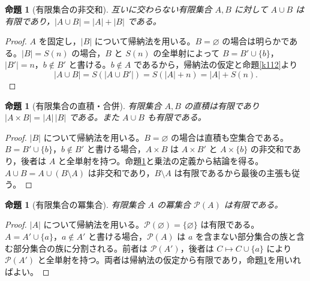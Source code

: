 \documentclass[a5paper,10pt,dvipdfmx]{jsarticle}
\theoremstyle{definition}
\theoremstyle{plain}
\newtheorem{prop}[ruledef]{命題}
\newcommand{\Pow}{\mathcal{P}}
\begin{document}
\begin{prop}[有限集合の非交和]\label{k115}
互いに交わらない有限集合 $A,B$ に対して $A\cup B$ は有限であり，$|A\cup B|=|A|+|B|$ である。
\end{prop}
\begin{proof}
$A$ を固定し，$|B|$ について帰納法を用いる。$B=\varnothing$ の場合は明らかである。$|B|=S(n)$ の場合，$B$ と $S(n)$ の全単射によって $B=B'\cup\{b\}$，$|B'|=n$，$b\notin B'$ と書ける。$b\notin A$ であるから，帰納法の仮定と命題\ref{k112}より
\[ |A\cup B|=S(|A\cup B'|)=S(|A|+n)=|A|+S(n). \]
\end{proof}
\begin{prop}[有限集合の直積・合併]\label{k116}
有限集合 $A,B$ の直積は有限であり $|A\times B|=|A|\,|B|$ である。また $A\cup B$ も有限である。
\end{prop}
\begin{proof}
$|B|$ について帰納法を用いる。$B=\varnothing$ の場合は直積も空集合である。$B=B'\cup\{b\}$，$b\notin B'$ と書ける場合，$A\times B$ は $A\times B'$ と $A\times\{b\}$ の非交和であり，後者は $A$ と全単射を持つ。命題\ref{k115}と乗法の定義から結論を得る。$A\cup B=A\cup(B\setminus A)$ は非交和であり，$B\setminus A$ は有限であるから最後の主張も従う。
\end{proof}
\begin{prop}[有限集合の冪集合]\label{k117}
有限集合 $A$ の冪集合 $\Pow(A)$ は有限である。
\end{prop}
\begin{proof}
$|A|$ について帰納法を用いる。$\Pow(\varnothing)=\{\varnothing\}$ は有限である。$A=A'\cup\{a\}$，$a\notin A'$ と書ける場合，$\Pow(A)$ は $a$ を含まない部分集合の族と含む部分集合の族に分割される。前者は $\Pow(A')$，後者は $C\mapsto C\cup\{a\}$ により $\Pow(A')$ と全単射を持つ。両者は帰納法の仮定から有限であり，命題\ref{k115}を用いればよい。
\end{proof}
\end{document}
